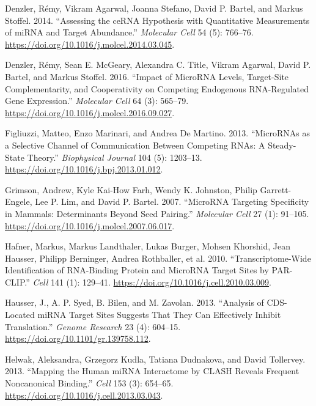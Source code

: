 \documentclass[a4,center,fleqn]{NAR}
\begin{document}
\leavevmode\hypertarget{ref-denzler_assessing_2014}{}%
Denzler, Rémy, Vikram Agarwal, Joanna Stefano, David P. Bartel, and
Markus Stoffel. 2014. ``Assessing the ceRNA Hypothesis with Quantitative
Measurements of miRNA and Target Abundance.'' \emph{Molecular Cell} 54
(5): 766--76. \url{https://doi.org/10.1016/j.molcel.2014.03.045}.

\leavevmode\hypertarget{ref-denzler_impact_2016}{}%
Denzler, Rémy, Sean E. McGeary, Alexandra C. Title, Vikram Agarwal,
David P. Bartel, and Markus Stoffel. 2016. ``Impact of MicroRNA Levels,
Target-Site Complementarity, and Cooperativity on Competing Endogenous
RNA-Regulated Gene Expression.'' \emph{Molecular Cell} 64 (3): 565--79.
\url{https://doi.org/10.1016/j.molcel.2016.09.027}.

\leavevmode\hypertarget{ref-figliuzzi_micrornas_2013}{}%
Figliuzzi, Matteo, Enzo Marinari, and Andrea De Martino. 2013.
``MicroRNAs as a Selective Channel of Communication Between Competing
RNAs: A Steady-State Theory.'' \emph{Biophysical Journal} 104 (5):
1203--13. \url{https://doi.org/10.1016/j.bpj.2013.01.012}.

\leavevmode\hypertarget{ref-grimson_microrna_2007}{}%
Grimson, Andrew, Kyle Kai-How Farh, Wendy K. Johnston, Philip
Garrett-Engele, Lee P. Lim, and David P. Bartel. 2007. ``MicroRNA
Targeting Specificity in Mammals: Determinants Beyond Seed Pairing.''
\emph{Molecular Cell} 27 (1): 91--105.
\url{https://doi.org/10.1016/j.molcel.2007.06.017}.

\leavevmode\hypertarget{ref-hafner_transcriptome-wide_2010}{}%
Hafner, Markus, Markus Landthaler, Lukas Burger, Mohsen Khorshid, Jean
Hausser, Philipp Berninger, Andrea Rothballer, et al. 2010.
``Transcriptome-Wide Identification of RNA-Binding Protein and MicroRNA
Target Sites by PAR-CLIP.'' \emph{Cell} 141 (1): 129--41.
\url{https://doi.org/10.1016/j.cell.2010.03.009}.

\leavevmode\hypertarget{ref-hausser_analysis_2013}{}%
Hausser, J., A. P. Syed, B. Bilen, and M. Zavolan. 2013. ``Analysis of
CDS-Located miRNA Target Sites Suggests That They Can Effectively
Inhibit Translation.'' \emph{Genome Research} 23 (4): 604--15.
\url{https://doi.org/10.1101/gr.139758.112}.

\leavevmode\hypertarget{ref-helwak_mapping_2013}{}%
Helwak, Aleksandra, Grzegorz Kudla, Tatiana Dudnakova, and David
Tollervey. 2013. ``Mapping the Human miRNA Interactome by CLASH Reveals
Frequent Noncanonical Binding.'' \emph{Cell} 153 (3): 654--65.
\url{https://doi.org/10.1016/j.cell.2013.03.043}.
\end{document}

